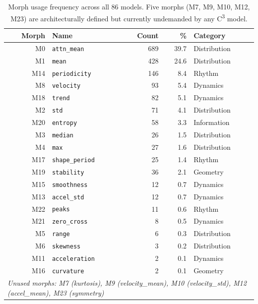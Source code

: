 \begin{table}[H]
\centering
\caption{Morph usage frequency across all 86 models.
Five morphs (M7, M9, M10, M12, M23) are architecturally defined
but currently undemanded by any C\textsuperscript{3} model.}
\label{tab:morph-usage}
\renewcommand{\arraystretch}{1.1}
\begin{tabular}{@{}rlrrp{5.5cm}@{}}
\toprule
\textbf{Morph} & \textbf{Name} & \textbf{Count} & \textbf{\%} & \textbf{Category} \\
\midrule
\rowcolor{cyan!8}
M0  & \texttt{attn\_mean}   & 689 & 39.7 & Distribution \\
\rowcolor{cyan!8}
M1  & \texttt{mean}         & 428 & 24.6 & Distribution \\
\rowcolor{green!8}
M14 & \texttt{periodicity}  & 146 &  8.4 & Rhythm \\
\rowcolor{orange!8}
M8  & \texttt{velocity}     &  93 &  5.4 & Dynamics \\
\rowcolor{orange!8}
M18 & \texttt{trend}        &  82 &  5.1 & Dynamics \\
\rowcolor{cyan!8}
M2  & \texttt{std}          &  71 &  4.1 & Distribution \\
\rowcolor{magenta!8}
M20 & \texttt{entropy}      &  58 &  3.3 & Information \\
\rowcolor{cyan!8}
M3  & \texttt{median}       &  26 &  1.5 & Distribution \\
\rowcolor{cyan!8}
M4  & \texttt{max}          &  27 &  1.6 & Distribution \\
\rowcolor{green!8}
M17 & \texttt{shape\_period} & 25 &  1.4 & Rhythm \\
\rowcolor{blue!8}
M19 & \texttt{stability}    &  36 &  2.1 & Geometry \\
\rowcolor{orange!8}
M15 & \texttt{smoothness}   &  12 &  0.7 & Dynamics \\
\rowcolor{orange!8}
M13 & \texttt{accel\_std}   &  12 &  0.7 & Dynamics \\
\rowcolor{green!8}
M22 & \texttt{peaks}        &  11 &  0.6 & Rhythm \\
\rowcolor{orange!8}
M21 & \texttt{zero\_cross}  &   8 &  0.5 & Dynamics \\
\rowcolor{cyan!8}
M5  & \texttt{range}        &   6 &  0.3 & Distribution \\
\rowcolor{cyan!8}
M6  & \texttt{skewness}     &   3 &  0.2 & Distribution \\
\rowcolor{orange!8}
M11 & \texttt{acceleration} &   2 &  0.1 & Dynamics \\
\rowcolor{blue!8}
M16 & \texttt{curvature}    &   2 &  0.1 & Geometry \\
\midrule
\multicolumn{5}{l}{\itshape Unused morphs: M7 (kurtosis), M9 (velocity\_mean),
M10 (velocity\_std), M12 (accel\_mean), M23 (symmetry)} \\
\bottomrule
\end{tabular}
\end{table}


